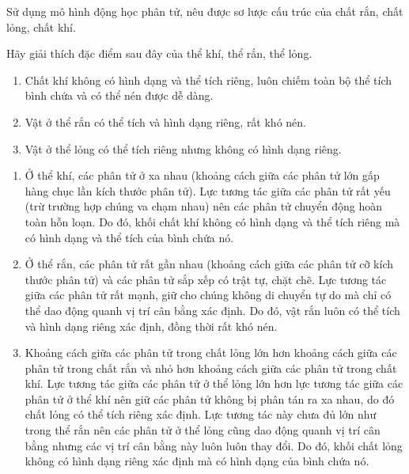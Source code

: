 \begin{dang}{Sử dụng mô hình động học phân tử, nêu được sơ lược cấu trúc của chất rắn, chất lỏng, chất khí.}
	{Hãy giải thích đặc điểm sau đây của thể khí, thể rắn, thể lỏng.
		\begin{enumerate}[label=\alph*)]
			\item Chất khí không có hình dạng và thể tích riêng, luôn chiếm toàn bộ thể tích bình chứa và có thể nén được dễ dàng.
			\item Vật ở thể rắn có thể tích và hình dạng riêng, rất khó nén.
			\item Vật ở thể lỏng có thể tích riêng nhưng không có hình dạng riêng.
		\end{enumerate}
	}
	{
		\begin{enumerate}[label=\alph*)]
			\item Ở thể khí, các phân tử ở xa nhau (khoảng cách giữa các phân tử lớn gấp hàng chục lần kích thước phân tử). Lực tương tác giữa các phân tử rất yếu (trừ trường hợp chúng va chạm nhau) nên các phân tử chuyển động hoàn toàn hỗn loạn. Do đó, khối chất khí không có hình dạng và thể tích riêng mà có hình dạng và thể tích của bình chứa nó.
			\item Ở thể rắn, các phân tử rất gần nhau (khoảng cách giữa các phân tử cỡ kích thước phân tử) và các phân tử sắp xếp có trật tự, chặt chẽ. Lực tương tác giữa các phân tử rất mạnh, giữ cho chúng không di chuyển tự do mà chỉ có thể dao động quanh vị trí cân bằng xác định. Do đó, vật rắn luôn có thể tích và hình dạng riêng xác định, đồng thời rất khó nén.
			\item Khoảng cách giữa các phân tử trong chất lỏng lớn hơn khoảng cách giữa các phân tử trong chất rắn và nhỏ hơn khoảng cách giữa các phân tử trong chất khí. Lực tương tác giữa các phân tử ở thể lỏng lớn hơn lực tương tác giữa các phân tử ở thể khí nên giữ các phân tử không bị phân tán ra xa nhau, do đó chất lỏng có thể tích riêng xác định. Lực tương tác này chưa đủ lớn như trong thể rắn nên các phân tử ở thể lỏng cũng dao động quanh vị trí cân bằng nhưng các vị trí cân bằng này luôn luôn thay đổi. Do đó, khối chất lỏng không có hình dạng riêng xác định mà có hình dạng của bình chứa nó.
		\end{enumerate}
	}
\end{dang}
